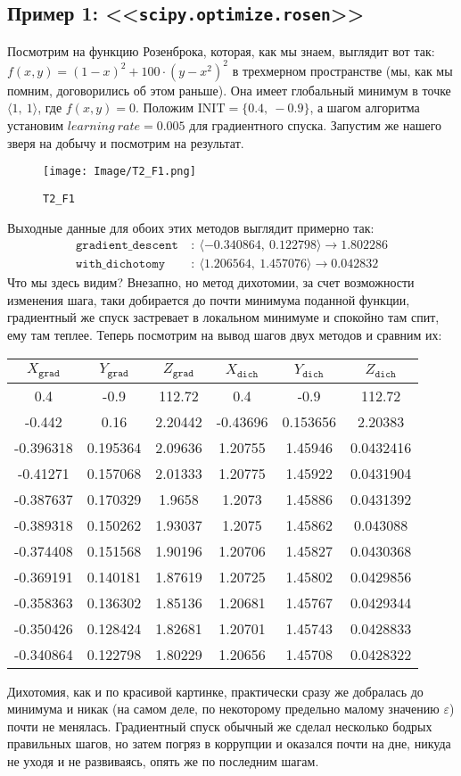 \documentclass[12pt, a4paper, oneside, final]{article}
\begin{document}
	\subsection*{Пример 1: <<\texttt{scipy.optimize.rosen}>>}
	Посмотрим на функцию Розенброка, которая, как мы знаем, выглядит вот так: $f(x, y) = (1 - x)^{2} + 100 \cdot (y - x^2)^2$ в трехмерном пространстве (мы, как мы помним, договорились об этом раньше). Она имеет глобальный минимум в точке $\langle 1, ~ 1 \rangle$, где $f(x, y) = 0$. Положим $\text{INIT} = \{0.4, ~ -0.9\}$, а шагом алгоритма установим $learning~rate = 0.005$ для градиентного спуска. Запустим же нашего зверя на добычу и посмотрим на результат.
	\begin{figure}[H]
		\centering
		\texttt{[image: Image/T2\_F1.png]}
		\caption*{\texttt{T2\_F1}}
	\end{figure}
	Выходные данные для обоих этих методов выглядит примерно так:
	\begin{align*}
		\texttt{gradient\_descent}~&:~\langle -0.340864, ~ 0.122798\rangle \to 1.802286 \\
		\texttt{with\_dichotomy}~&:~\langle 1.206564, ~ 1.457076\rangle \to 0.042832
	\end{align*}
	Что мы здесь видим? Внезапно, но метод дихотомии, за счет возможности изменения шага, таки добирается до почти минимума поданной функции, градиентный же спуск застревает в локальном минимуме и спокойно там спит, ему там теплее. Теперь посмотрим на вывод шагов двух методов и сравним их:
	\begin{table}[H]
		\centering
		\begin{tabular}{|c|c|c|c|c|c|}
			$X_{\texttt{grad}}$ & $Y_{\texttt{grad}}$ & $Z_{\texttt{grad}}$ & $X_{\texttt{dich}}$ & $Y_{\texttt{dich}}$ & $Z_{\texttt{dich}}$ \\ \hline
			0.4&-0.9&112.72&0.4&-0.9&112.72 \\
			-0.442&0.16&2.20442&-0.43696&0.153656&2.20383 \\
			-0.396318&0.195364&2.09636&1.20755&1.45946&0.0432416 \\
			-0.41271&0.157068&2.01333&1.20775&1.45922&0.0431904 \\
			-0.387637&0.170329&1.9658&1.2073&1.45886&0.0431392 \\
			-0.389318&0.150262&1.93037&1.2075&1.45862&0.043088 \\
			-0.374408&0.151568&1.90196&1.20706&1.45827&0.0430368 \\
			-0.369191&0.140181&1.87619&1.20725&1.45802&0.0429856 \\
			-0.358363&0.136302&1.85136&1.20681&1.45767&0.0429344 \\
			-0.350426&0.128424&1.82681&1.20701&1.45743&0.0428833 \\
			-0.340864&0.122798&1.80229&1.20656&1.45708&0.0428322
		\end{tabular}
	\end{table}
	Дихотомия, как и по красивой картинке, практически сразу же добралась до минимума и никак (на самом деле, по некоторому предельно малому значению $\varepsilon$) почти не менялась. Градиентный спуск обычный же сделал несколько бодрых правильных шагов, но затем погряз в коррупции и оказался почти на дне, никуда не уходя и не развиваясь, опять же по последним шагам.
\end{document}
